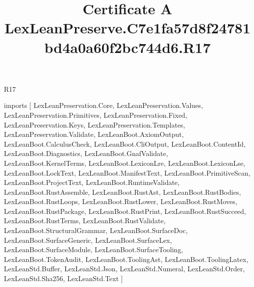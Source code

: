 \begin{lexlean}{R17}
\title{Certificate A LexLeanPreserve.C7e1fa57d8f24781bd4a0a60f2bc744d6.R17}
\begin{coremodule}
imports [
  LexLeanPreservation.Core,
  LexLeanPreservation.Values,
  LexLeanPreservation.Primitives,
  LexLeanPreservation.Fixed,
  LexLeanPreservation.Keys,
  LexLeanPreservation.Templates,
  LexLeanPreservation.Validate,
  LexLeanBoot.AxiomOutput,
  LexLeanBoot.CalculusCheck,
  LexLeanBoot.CliOutput,
  LexLeanBoot.ContentId,
  LexLeanBoot.Diagnostics,
  LexLeanBoot.GnafValidate,
  LexLeanBoot.KernelTerms,
  LexLeanBoot.LexiconLre,
  LexLeanBoot.LexiconLse,
  LexLeanBoot.LockText,
  LexLeanBoot.ManifestText,
  LexLeanBoot.PrimitiveScan,
  LexLeanBoot.ProjectText,
  LexLeanBoot.RuntimeValidate,
  LexLeanBoot.RustAssemble,
  LexLeanBoot.RustAst,
  LexLeanBoot.RustBodies,
  LexLeanBoot.RustLoops,
  LexLeanBoot.RustLower,
  LexLeanBoot.RustMoves,
  LexLeanBoot.RustPackage,
  LexLeanBoot.RustPrint,
  LexLeanBoot.RustSucceed,
  LexLeanBoot.RustTerms,
  LexLeanBoot.RustValidate,
  LexLeanBoot.StructuralGrammar,
  LexLeanBoot.SurfaceDoc,
  LexLeanBoot.SurfaceGeneric,
  LexLeanBoot.SurfaceLex,
  LexLeanBoot.SurfaceModule,
  LexLeanBoot.SurfaceTooling,
  LexLeanBoot.TokenAudit,
  LexLeanBoot.ToolingAst,
  LexLeanBoot.ToolingLatex,
  LexLeanStd.Buffer,
  LexLeanStd.Json,
  LexLeanStd.Numeral,
  LexLeanStd.Order,
  LexLeanStd.Sha256,
  LexLeanStd.Text
]


\end{coremodule}
\end{lexlean}
